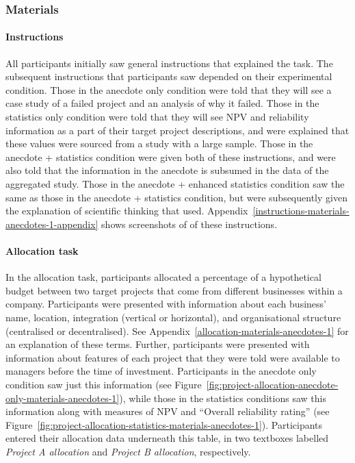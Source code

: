 \documentclass[a4paper, nobind, dvipsnames]{templates/ociamthesis}
\theoremstyle{definition}
\theoremstyle{definition}
\theoremstyle{definition}
\theoremstyle{definition}
\theoremstyle{remark}
\begin{document}
\hypertarget{materials-anecdotes-1}{%
\subsubsection{Materials}\label{materials-anecdotes-1}}

\hypertarget{instructions-3}{%
\paragraph{Instructions}\label{instructions-3}}

All participants initially saw general instructions that explained the task. The
subsequent instructions that participants saw depended on their experimental
condition. Those in the anecdote only condition were told that they will see a
case study of a failed project and an analysis of why it failed. Those in the
statistics only condition were told that they will see NPV and reliability
information as a part of their target project descriptions, and were explained
that these values were sourced from a study with a large sample. Those in the
anecdote + statistics condition were given both of these instructions, and were
also told that the information in the anecdote is subsumed in the data of the
aggregated study. Those in the anecdote + enhanced statistics condition saw the
same as those in the anecdote + statistics condition, but were subsequently
given the explanation of scientific thinking that \textcite{wainberg2018} used.
Appendix~\ref{instructions-materials-anecdotes-1-appendix} shows screenshots of
of these instructions.

\hypertarget{allocation-task}{%
\paragraph{Allocation task}\label{allocation-task}}

In the allocation task, participants allocated a percentage of a hypothetical
budget between two target projects that come from different businesses within a
company. Participants were presented with information about each business' name,
location, integration (vertical or horizontal), and organisational structure
(centralised or decentralised). See
Appendix~\ref{allocation-materials-anecdotes-1} for an explanation of these
terms. Further, participants were presented with information about features of
each project that they were told were available to managers before the time of
investment. Participants in the anecdote only condition saw just this
information (see
Figure~\ref{fig:project-allocation-anecdote-only-materials-anecdotes-1}), while
those in the statistics conditions saw this information along with measures of
NPV and ``Overall reliability rating'' (see
Figure~\ref{fig:project-allocation-statistics-materials-anecdotes-1}).
Participants entered their allocation data underneath this table, in two
textboxes labelled \emph{Project A allocation} and \emph{Project B allocation},
respectively.
\end{document}
